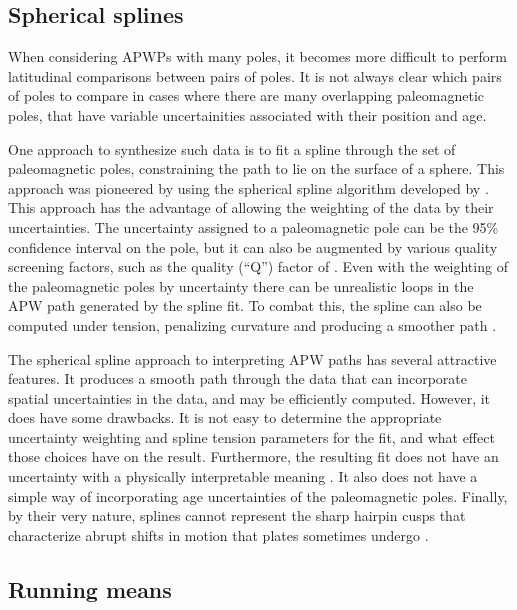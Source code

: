 \documentclass[11pt,letterpaper]{article}
\begin{document}
\subsection*{Spherical splines}
When considering APWPs with many poles, it becomes more difficult to perform latitudinal comparisons between pairs of poles. It is not always clear which pairs of poles to compare in cases where there are many overlapping paleomagnetic poles, that have variable uncertainities associated with their position and age.

One approach to synthesize such data is to fit a spline through the set of paleomagnetic poles, constraining the path to lie on the surface of a sphere.
This approach was pioneered by \citet{Torsvik1992a} using the spherical spline algorithm developed by \citet{Jupp1987a}. This approach has the advantage of allowing the weighting of the data by their uncertainties. The uncertainty assigned to a paleomagnetic pole can be the 95\% confidence interval on the pole, but it can also be augmented by various quality screening factors, such as the quality (``Q'') factor of \citet{Van-der-Voo1990a} \citep{Torsvik1992a}. Even with the weighting of the paleomagnetic poles by uncertainty there can be unrealistic loops in the APW path generated by the spline fit. To combat this, the spline can also be computed under tension, penalizing curvature and producing a smoother path \citep{Torsvik1996a}.

The spherical spline approach to interpreting APW paths has several attractive features. It produces a smooth path through the data that can incorporate spatial uncertainties in the data, and may be efficiently computed. However, it does have some drawbacks. It is not easy to determine the appropriate uncertainty weighting and spline tension parameters for the fit, and what effect those choices have on the result. Furthermore, the resulting fit does not have an uncertainty with a physically interpretable meaning \citep{Torsvik1996a}. It also does not have a simple way of incorporating age uncertainties of the paleomagnetic poles. Finally, by their very nature, splines cannot represent the sharp hairpin cusps that characterize abrupt shifts in motion that plates sometimes undergo \citep{Irving1972a, Gordon1984a}.

\subsection*{Running means}
\end{document}
